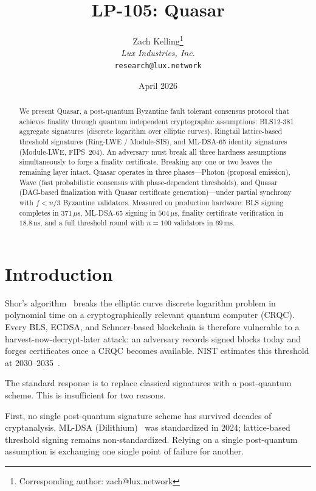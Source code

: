 \documentclass[11pt,a4paper]{article}
\title{LP-105: Quasar}
\author{
Zach Kelling\thanks{Corresponding author: zach@lux.network}\\
\textit{Lux Industries, Inc.}\\
\texttt{research@lux.network}
}
\date{April 2026}
\begin{document}
\luxcoverpage

\begin{abstract}
We present Quasar, a post-quantum Byzantine fault tolerant consensus protocol
that achieves finality through quantum independent cryptographic assumptions:
BLS12-381 aggregate signatures (discrete logarithm over elliptic curves),
Ringtail lattice-based threshold signatures (Ring-LWE / Module-SIS), and
ML-DSA-65 identity signatures (Module-LWE, FIPS~204). An adversary must break
all three hardness assumptions simultaneously to forge a finality certificate.
Breaking any one or two leaves the remaining layer intact. Quasar operates in
three phases---Photon (proposal emission), Wave (fast probabilistic consensus
with phase-dependent thresholds), and Quasar (DAG-based finalization with
Quasar certificate generation)---under partial synchrony with $f < n/3$
Byzantine validators. Measured on production hardware: BLS signing completes
in $371\,\mu\text{s}$, ML-DSA-65 signing in $504\,\mu\text{s}$, finality
certificate verification in $18.8\,\text{ns}$, and a full threshold round
with $n=100$ validators in $69\,\text{ms}$.
\end{abstract}

\tableofcontents
\newpage

\section{Introduction}
\label{sec:introduction}

Shor's algorithm~\cite{shor1994} breaks the elliptic curve discrete logarithm
problem in polynomial time on a cryptographically relevant quantum computer
(CRQC). Every BLS, ECDSA, and Schnorr-based blockchain is therefore vulnerable
to a harvest-now-decrypt-later attack: an adversary records signed blocks today
and forges certificates once a CRQC becomes available. NIST estimates this
threshold at 2030--2035~\cite{mosca2018}.

The standard response is to replace classical signatures with a post-quantum
scheme. This is insufficient for two reasons.

First, no single post-quantum signature scheme has survived decades of
cryptanalysis. ML-DSA (Dilithium)~\cite{nist-pqc} was standardized in 2024;
lattice-based threshold signing remains non-standardized. Relying on a single
post-quantum assumption is exchanging one single point of failure for another.
\end{document}
